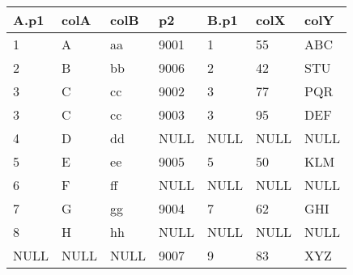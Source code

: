\documentclass[10pt, a4paper, ngerman]{arbeitsblatt}
\begin{document}
\begin{aufgabe}
\begin{tabular}{|*{7}{l|}}\hline
	\rowcolor{ab.tabelle.kopf.hg}
	A.p1 & colA & colB & p2 & B.p1 & colX & colY      \\
	\hline
	1 & A & aa & 9001 & 1 & 55 & ABC \\\hline
	2 & B & bb & 9006 & 2 & 42 & STU \\\hline
	3 & C & cc & 9002 & 3 & 77 & PQR \\\hline
	3 & C & cc & 9003 & 3 & 95 & DEF \\\hline
	4 & D & dd & NULL & NULL & NULL & NULL\\\hline
	5 & E & ee & 9005 & 5 & 50 & KLM \\\hline
	6 & F & ff & NULL & NULL & NULL & NULL \\\hline
	7 & G & gg & 9004 & 7 & 62 & GHI \\\hline
	8 & H & hh & NULL & NULL & NULL & NULL \\\hline
	NULL & NULL & NULL & 9007 & 9 & 83 & XYZ \\\hline
\end{tabular}
\end{aufgabe}
\end{document}

